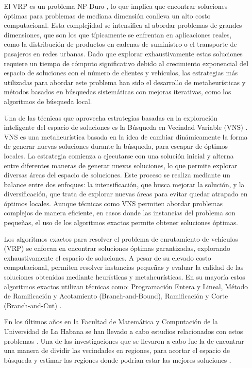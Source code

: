 \documentclass[12pt]{article}
\begin{document}
El VRP es un problema NP-Duro \cite{ref21}, lo que implica que encontrar soluciones óptimas para problemas de mediana dimensión conlleva un alto costo computacional. Esta complejidad se intensifica al abordar problemas de grandes dimensiones, que son los que típicamente se enfrentan en aplicaciones reales, como la distribución de productos en cadenas de suministro o el transporte de pasajeros en redes urbanas. Dado que explorar exhaustivamente estas soluciones requiere un tiempo de cómputo significativo debido al crecimiento exponencial del espacio de soluciones con el número de clientes y vehículos, las estrategias más utilizadas para abordar este problema han sido el desarrollo de metaheurísticas \cite{ref4} y métodos basados en búsquedas sistemáticas con mejoras iterativas, como los algoritmos de búsqueda local.

Una de las técnicas que aprovecha estrategias basadas en la exploración inteligente del espacio de soluciones es la Búsqueda en Vecindad Variable (VNS) \cite{ref17}. VNS es una metaheurística basada en la idea de cambiar dinámicamente la forma de generar nuevas soluciones durante la búsqueda, para escapar de óptimos locales. La estrategia comienza a ejecutarse con una solución inicial y alterna entre diferentes maneras de generar nuevas soluciones, lo que permite explorar diversas áreas del espacio de soluciones. Este proceso se realiza mediante un balance entre dos enfoques: la intensificación, que busca mejorar la solución, y la diversificación, que trata de explorar nuevas áreas para evitar quedar atrapado en óptimos locales. Aunque técnicas como VNS permiten abordar problemas complejos de manera eficiente, en casos donde las instancias del problema son pequeñas, el uso de los algoritmos exactos permite obtener soluciones óptimas.

Los algoritmos exactos para resolver el problema de enrutamiento de vehículos (VRP) se enfocan en encontrar soluciones óptimas garantizadas, explorando exhaustivamente el espacio de soluciones. A pesar de su elevado costo computacional, permiten resolver instancias pequeñas y evaluar la calidad de las soluciones obtenidas mediante heurísticas y metaheurísticas. En su mayoría estos algoritmos exactos utilizan técnicas como: Programación Entera y Lineal, Método de Ramificación y Acotamiento (Branch-and-Bound), Ramificación y Corte (Branch-and-Cut) \cite{ref7}.

En los últimos años en la Facultad de Matemática y Computación de la Universidad de La Habana se han llevado a cabo estudios relacionados con estos problemas \cite{ref5,ref6,ref4,ref3}. Una de las investigaciones que se llevaron a cabo fue la de encontrar una manera de dividir las vecindades en regiones, para acortar el espacio de búsqueda y estimar las regiones donde podrían estar las mejores soluciones \cite{ref6}.
\end{document}
